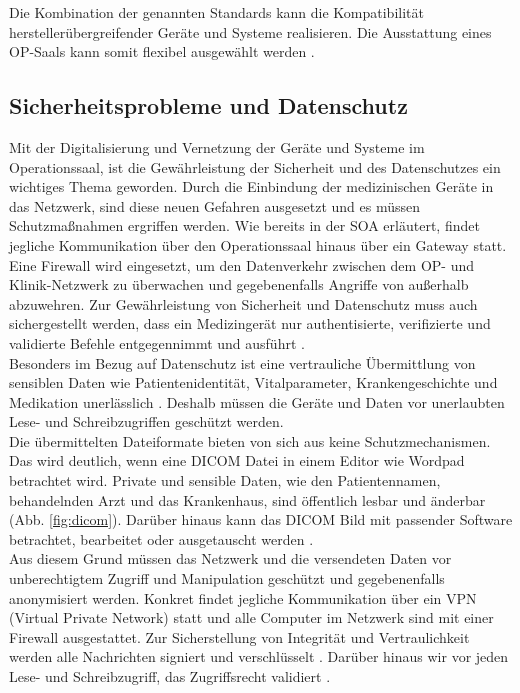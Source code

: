Die Kombination der genannten Standards kann die Kompatibilität herstellerübergreifender Geräte und Systeme realisieren. 
Die Ausstattung eines OP-Saals kann somit flexibel ausgewählt werden \cite{DerDigitaleOperationssaal}.

\subsection{Sicherheitsprobleme und Datenschutz}

Mit der Digitalisierung und Vernetzung der Geräte und Systeme im Operationssaal, ist die Gewährleistung der Sicherheit und des Datenschutzes ein wichtiges Thema geworden.
Durch die Einbindung der medizinischen Geräte in das Netzwerk, sind diese neuen Gefahren ausgesetzt und es müssen Schutzmaßnahmen ergriffen werden. Wie bereits in der SOA erläutert, findet jegliche Kommunikation über den Operationssaal hinaus über ein Gateway statt. Eine Firewall wird eingesetzt, um den Datenverkehr zwischen dem OP- und Klinik-Netzwerk zu überwachen und gegebenenfalls Angriffe von außerhalb abzuwehren. Zur Gewährleistung von Sicherheit und Datenschutz muss auch sichergestellt werden, dass \glqq ein Medizingerät nur authentisierte, verifizierte und validierte Befehle entgegennimmt und ausführt\grqq{} \cite{DerDigitaleOperationssaal}. \\
Besonders im Bezug auf Datenschutz ist eine \glqq vertrauliche Übermittlung von sensiblen Daten wie Patientenidentität, Vitalparameter, Krankengeschichte und Medikation unerlässlich\grqq{} \cite{DerDigitaleOperationssaal}. Deshalb müssen die Geräte und Daten vor unerlaubten Lese- und Schreibzugriffen geschützt werden. \\
Die übermittelten Dateiformate bieten von sich aus keine Schutzmechanismen. Das wird deutlich, wenn eine DICOM Datei in einem Editor wie Wordpad betrachtet wird. Private und sensible Daten, wie den Patientennamen, behandelnden Arzt und das Krankenhaus, sind öffentlich lesbar und änderbar (Abb. \ref{fig:dicom}). Darüber hinaus kann das DICOM Bild mit passender Software betrachtet, bearbeitet oder ausgetauscht werden \cite{DICOM}.\\

Aus diesem Grund müssen das Netzwerk und die versendeten Daten vor unberechtigtem Zugriff und Manipulation geschützt und gegebenenfalls anonymisiert werden. Konkret findet jegliche Kommunikation über ein VPN (Virtual Private Network) statt und alle Computer im Netzwerk sind mit einer Firewall ausgestattet. Zur Sicherstellung von Integrität und Vertraulichkeit werden alle Nachrichten signiert und verschlüsselt \cite{DerDigitaleOperationssaal}. Darüber hinaus wir vor jeden Lese- und Schreibzugriff, das Zugriffsrecht validiert \cite{DICOM}.

